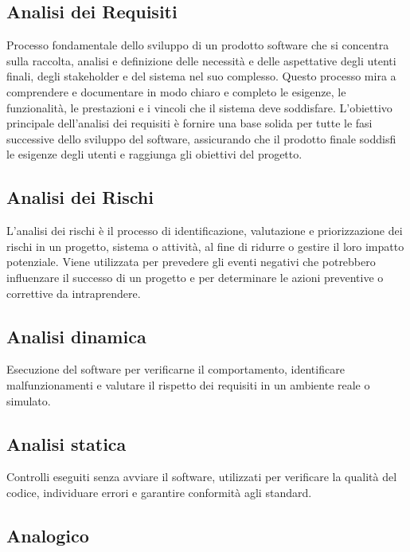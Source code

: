 \subsection*{Analisi dei Requisiti}
Processo fondamentale dello sviluppo di un prodotto software che si concentra sulla raccolta, analisi e definizione delle necessità e delle aspettative 
degli utenti finali, degli stakeholder e del sistema nel suo complesso. Questo processo mira a comprendere e documentare in modo chiaro e completo le 
esigenze, le funzionalità, le prestazioni e i vincoli che il sistema deve soddisfare. L’obiettivo principale dell’analisi dei requisiti è fornire una 
base solida per tutte le fasi successive dello sviluppo del software, assicurando che il prodotto finale soddisfi le esigenze degli utenti e raggiunga 
gli obiettivi del progetto.

\subsection*{Analisi dei Rischi}
L'analisi dei rischi è il processo di identificazione, valutazione e priorizzazione dei rischi in un progetto, sistema o attività, al fine di ridurre 
o gestire il loro impatto potenziale. Viene utilizzata per prevedere gli eventi negativi che potrebbero influenzare il successo di un progetto e per 
determinare le azioni preventive o correttive da intraprendere.

\hypertarget{sec:analisi_dinamica}{}
\subsection*{Analisi dinamica}
Esecuzione del software per verificarne il comportamento, identificare malfunzionamenti e valutare il rispetto dei requisiti in un ambiente reale o simulato.

\hypertarget{sec:analisi_statica}{}
\subsection*{Analisi statica}
Controlli eseguiti senza avviare il software, utilizzati per verificare la qualità del codice, individuare errori e garantire conformità agli standard.

\hypertarget{sec:analogico}{}
\subsection*{Analogico}


\hypertarget{sec:angular}{}
